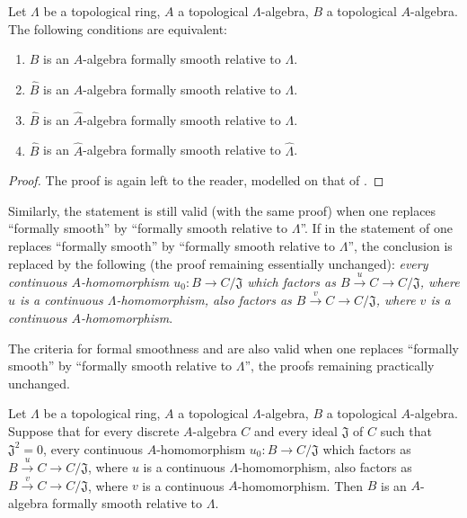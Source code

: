\begin{proposition}[19.9.4]
\label{0.19.9.4}
Let $\Lambda$ be a topological ring, $A$ a topological $\Lambda$-algebra, $B$ a topological $A$-algebra.
The following conditions are equivalent:
\begin{enumerate}
  \item[\rm a)] $B$ is an $A$-algebra formally smooth relative to $\Lambda$.
  \item[\rm b)] $\widehat{B}$ is an $A$-algebra formally smooth relative to $\Lambda$.
  \item[\rm c)] $\widehat{B}$ is an $\widehat{A}$-algebra formally smooth relative to $\Lambda$.
  \item[\rm d)] $\widehat{B}$ is an $\widehat{A}$-algebra formally smooth relative to $\widehat{\Lambda}$.
\end{enumerate}
\end{proposition}

\begin{proof}
The proof is again left to the reader, modelled on that of .
\end{proof}

\begin{env}[19.9.5]
\label{0.19.9.5}
Similarly, the statement  is still valid (with the same proof) when one replaces ``formally smooth'' by ``formally smooth relative to $\Lambda$''.
If in the statement of  one replaces ``formally smooth'' by ``formally smooth relative to $\Lambda$'', the conclusion is replaced by the following (the proof remaining essentially unchanged): \emph{every continuous $A$-homomorphism $u_0:B\to C/\mathfrak{J}$ which factors as $B\xrightarrow{u}C\to C/\mathfrak{J}$, where $u$ is a continuous $\Lambda$-homomorphism, also factors as $B\xrightarrow{v}C\to C/\mathfrak{J}$, where $v$ is a continuous $A$-homomorphism}.
\end{env}

\begin{env}[19.9.6]
\label{0.19.9.6}
The criteria for formal smoothness  and  are also valid when one replaces ``formally smooth'' by ``formally smooth relative to $\Lambda$'', the proofs remaining practically unchanged.
\end{env}

\begin{proposition}[19.9.7]
\label{0.19.9.7}
Let $\Lambda$ be a topological ring, $A$ a topological $\Lambda$-algebra, $B$ a topological $A$-algebra.
Suppose that for every discrete $A$-algebra $C$ and every ideal $\mathfrak{J}$ of $C$ such that $\mathfrak{J}^2=0$, every continuous $A$-homomorphism $u_0:B\to C/\mathfrak{J}$ which factors as $B\xrightarrow{u}C\to C/\mathfrak{J}$, where $u$ is a continuous $\Lambda$-homomorphism, also factors as $B\xrightarrow{v}C\to C/\mathfrak{J}$, where $v$ is a continuous $A$-homomorphism.
Then $B$ is an $A$-algebra formally smooth relative to $\Lambda$.
\end{proposition}

